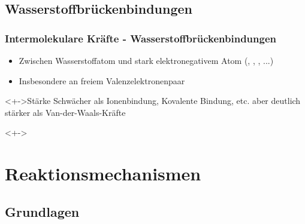 \subsection{Wasserstoffbrückenbindungen}
\begin{frame}
\frametitle{Intermolekulare Kräfte - Wasserstoffbrückenbindungen}
\begin{itemize}
	\item<+-> Zwischen Wasserstoffatom und stark elektronegativem Atom (, , , ...)
	\item<+-> Insbesondere an freiem Valenzelektronenpaar
\end{itemize}
\begin{block}<+->{Stärke}
	Schwächer als Ionenbindung, Kovalente Bindung, etc. aber deutlich stärker als Van-der-Waals-Kräfte
\end{block}
\begin{examples}<+->
\end{examples}
\end{frame}

\section{Reaktionsmechanismen}
\subsection{Grundlagen}
